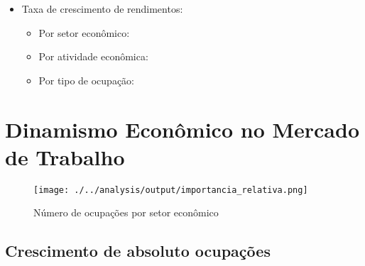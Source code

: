 \documentclass[10pt]{beamer}
\begin{document}
\begin{frame}[label=indice_principal]{}
\begin{itemize}
\item{Taxa de crescimento de rendimentos:
	\begin{itemize}
	\item{Por setor econômico: \hyperlink{rkngtxrendaporsetor}{}}
	\item{Por atividade econômica: \hyperlink{rkngtxrendaporatividade}{}}
	\item{Por tipo de ocupação: \hyperlink{rkngtxrendaporocupacao}{}}
	\end{itemize}
}
\vspace{1mm}

\end{itemize}


\end{frame}

\section{Dinamismo Econômico no Mercado de Trabalho}

\begin{frame}
\textit{\hyperlink{indice_principal}{}}
\begin{figure}
  \centering
  \texttt{[image: ./../analysis/output/importancia\_relativa.png]}
  \label{importancia_relativa}
  \caption{{Número de ocupações por setor econômico}}
\end{figure}
\end{frame}

\subsection{Crescimento de absoluto ocupações}

\begin{frame}
\textit{\hyperlink{indice_principal}{}}

\end{frame}


\begin{frame}
\textit{\hyperlink{indice_principal}{}}

\end{frame}


\begin{frame}
\textit{\hyperlink{indice_principal}{}}

\end{frame}
\end{document}

